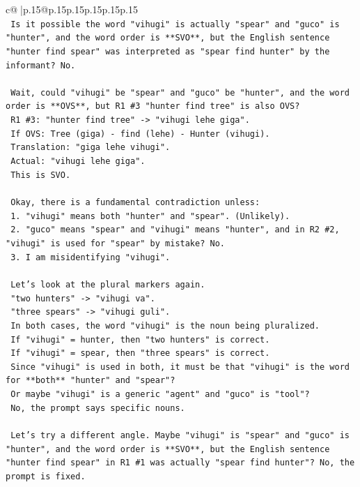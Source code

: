 \documentclass{article}
\begin{document}
{\begin{supertabular}{c@{$\;$}|p{.15\linewidth}@{}p{.15\linewidth}p{.15\linewidth}p{.15\linewidth}p{.15\linewidth}p{.15\linewidth}}
{{{\\ 
\texttt{   Is it possible the word "vihugi" is actually "spear" and "guco" is "hunter", and the word order is **SVO**, but the English sentence "hunter find spear" was interpreted as "spear find hunter" by the informant? No.} \\
\\ 
\texttt{   Wait, could "vihugi" be "spear" and "guco" be "hunter", and the word order is **OVS**, but R1 \#3 "hunter find tree" is also OVS?} \\
\texttt{   R1 \#3: "hunter find tree" {-}> "vihugi lehe giga".} \\
\texttt{   If OVS: Tree (giga) {-} find (lehe) {-} Hunter (vihugi).} \\
\texttt{   Translation: "giga lehe vihugi".} \\
\texttt{   Actual: "vihugi lehe giga".} \\
\texttt{   This is SVO.} \\
\\ 
\texttt{   Okay, there is a fundamental contradiction unless:} \\
\texttt{   1. "vihugi" means both "hunter" and "spear". (Unlikely).} \\
\texttt{   2. "guco" means "spear" and "vihugi" means "hunter", and in R2 \#2, "vihugi" is used for "spear" by mistake? No.} \\
\texttt{   3. I am misidentifying "vihugi".} \\
\\ 
\texttt{   Let's look at the plural markers again.} \\
\texttt{   "two hunters" {-}> "vihugi va".} \\
\texttt{   "three spears" {-}> "vihugi guli".} \\
\texttt{   In both cases, the word "vihugi" is the noun being pluralized.} \\
\texttt{   If "vihugi" = hunter, then "two hunters" is correct.} \\
\texttt{   If "vihugi" = spear, then "three spears" is correct.} \\
\texttt{   Since "vihugi" is used in both, it must be that "vihugi" is the word for **both** "hunter" and "spear"?} \\
\texttt{   Or maybe "vihugi" is a generic "agent" and "guco" is "tool"?} \\
\texttt{   No, the prompt says specific nouns.} \\
\\ 
\texttt{   Let's try a different angle. Maybe "vihugi" is "spear" and "guco" is "hunter", and the word order is **SVO**, but the English sentence "hunter find spear" in R1 \#1 was actually "spear find hunter"? No, the prompt is fixed.} \\
}}}
\end{supertabular}}
\end{document}
